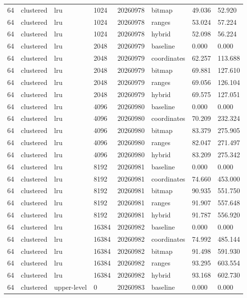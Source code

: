 \begin{tabular}{llllllll}
64 & clustered & lru & 1024 & 20260978 & bitmap & 49.036 & 52.920 \\
64 & clustered & lru & 1024 & 20260978 & ranges & 53.024 & 57.224 \\
64 & clustered & lru & 1024 & 20260978 & hybrid & 52.098 & 56.224 \\
64 & clustered & lru & 2048 & 20260979 & baseline & 0.000 & 0.000 \\
64 & clustered & lru & 2048 & 20260979 & coordinates & 62.257 & 113.688 \\
64 & clustered & lru & 2048 & 20260979 & bitmap & 69.881 & 127.610 \\
64 & clustered & lru & 2048 & 20260979 & ranges & 69.056 & 126.104 \\
64 & clustered & lru & 2048 & 20260979 & hybrid & 69.575 & 127.051 \\
64 & clustered & lru & 4096 & 20260980 & baseline & 0.000 & 0.000 \\
64 & clustered & lru & 4096 & 20260980 & coordinates & 70.209 & 232.324 \\
64 & clustered & lru & 4096 & 20260980 & bitmap & 83.379 & 275.905 \\
64 & clustered & lru & 4096 & 20260980 & ranges & 82.047 & 271.497 \\
64 & clustered & lru & 4096 & 20260980 & hybrid & 83.209 & 275.342 \\
64 & clustered & lru & 8192 & 20260981 & baseline & 0.000 & 0.000 \\
64 & clustered & lru & 8192 & 20260981 & coordinates & 74.660 & 453.000 \\
64 & clustered & lru & 8192 & 20260981 & bitmap & 90.935 & 551.750 \\
64 & clustered & lru & 8192 & 20260981 & ranges & 91.907 & 557.648 \\
64 & clustered & lru & 8192 & 20260981 & hybrid & 91.787 & 556.920 \\
64 & clustered & lru & 16384 & 20260982 & baseline & 0.000 & 0.000 \\
64 & clustered & lru & 16384 & 20260982 & coordinates & 74.992 & 485.144 \\
64 & clustered & lru & 16384 & 20260982 & bitmap & 91.498 & 591.930 \\
64 & clustered & lru & 16384 & 20260982 & ranges & 93.295 & 603.554 \\
64 & clustered & lru & 16384 & 20260982 & hybrid & 93.168 & 602.730 \\
64 & clustered & upper-level & 0 & 20260983 & baseline & 0.000 & 0.000 \\

\end{tabular}
